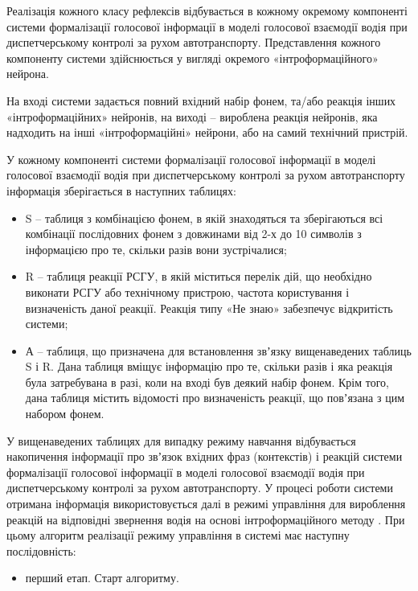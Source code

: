 Реалізація кожного класу рефлексів відбувається в кожному окремому компоненті системи формалізації голосової інформації в моделі голосової взаємодії водія при диспетчерському контролі за рухом автотранспорту. Представлення кожного компоненту системи здійснюється у вигляді окремого «інтроформаційного» нейрона.

На вході системи задається повний вхідний набір фонем, та/або реакція інших «інтроформаційних» нейронів, на виході – вироблена реакція нейронів, яка надходить на інші «інтроформаційні» нейрони, або на самий технічний пристрій.

У кожному компоненті системи формалізації голосової інформації в моделі голосової взаємодії водія при диспетчерському контролі за рухом автотранспорту інформація зберігається в наступних таблицях:

\begin{itemize}
	\item S – таблиця з комбінацією фонем, в якій знаходяться та зберігаються всі комбінації послідовних фонем з довжинами від 2-х до 10 символів з інформацією про те, скільки разів вони зустрічалися;
	\item R – таблиця реакції РСГУ, в якій міститься перелік дій, що необхідно виконати РСГУ або технічному пристрою, частота користування і визначеність даної реакції. Реакція типу «Не знаю» забезпечує відкритість системи;
	\item А – таблиця, що призначена для встановлення звʼязку вищенаведених таблиць S і R. Дана таблиця вміщує інформацію про те, скільки разів і яка реакція була затребувана в разі, коли на вході був деякий набір фонем. Крім того, дана таблиця містить відомості про визначеність реакції, що повʼязана з цим набором фонем.
\end{itemize}

У вищенаведених таблицях для випадку режиму навчання відбувається накопичення інформації про звʼязок вхідних фраз (контекстів) і реакцій системи формалізації голосової інформації в моделі голосової взаємодії водія при диспетчерському контролі за рухом автотранспорту. У процесі роботи системи отримана інформація використовується далі в режимі управління для вироблення реакцій на відповідні звернення водія на основі інтроформаційного методу \cite{Teslia_2010}. При цьому алгоритм реалізації режиму управління в системі має наступну послідовність:

\begin{itemize}
	\item перший етап. Старт алгоритму.
\end{itemize}

